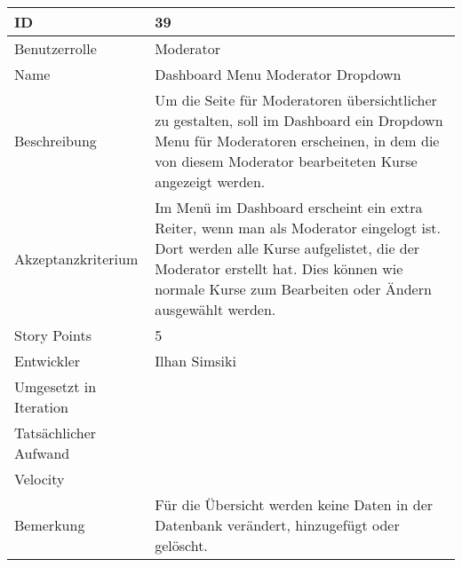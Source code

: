 \begin{tabularx}{\textwidth}{|p{}|X|}
	\hline
	ID & 39 \\
	\hline
	Benutzerrolle & Moderator \\
	\hline
	Name & Dashboard Menu Moderator Dropdown\\
	\hline
	Beschreibung & Um die Seite für Moderatoren übersichtlicher zu gestalten, soll im Dashboard ein Dropdown Menu für Moderatoren erscheinen, in dem die von diesem Moderator bearbeiteten Kurse angezeigt werden. \\
	\hline
	Akzeptanzkriterium & Im Menü im Dashboard erscheint ein extra Reiter, wenn man als Moderator eingelogt ist. Dort werden alle Kurse aufgelistet, die der Moderator erstellt hat. Dies können wie normale Kurse zum Bearbeiten oder Ändern ausgewählt werden. \\
	\hline
	Story Points & 5\\
	\hline
	Entwickler & Ilhan Simsiki\\
	\hline
	Umgesetzt in Iteration & \\
	\hline
	Tatsächlicher Aufwand & \\
	\hline
	Velocity & \\
	\hline
	Bemerkung & Für die Übersicht werden keine Daten in der Datenbank verändert, hinzugefügt oder gelöscht.\\
	\hline
\end{tabularx}
\vspace{20pt}
